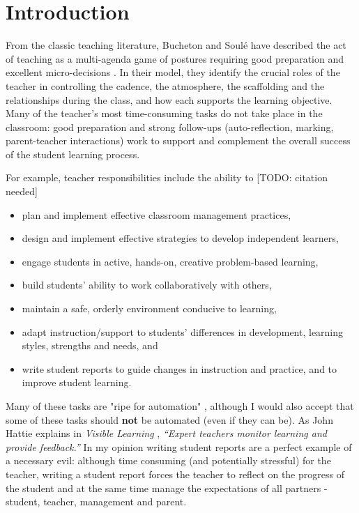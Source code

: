 \documentclass[10pt]{article}
\begin{document}
\tableofcontents



\section{Introduction}

From the classic teaching literature, Bucheton and Soulé have described the act of teaching as a multi-agenda game of postures requiring good preparation and excellent micro-decisions \cite{BS09}. In their model, they identify the crucial roles of the teacher in controlling the cadence, the atmosphere, the scaffolding and the relationships during the class, and how each supports the learning objective. Many of the teacher's most time-consuming tasks do not take place in the classroom: good preparation and strong follow-ups (auto-reflection, marking, parent-teacher interactions) work to support and complement the overall success of the student learning process.

For example, teacher responsibilities include the ability to [TODO: citation needed]
\begin{itemize}
\item plan and implement effective classroom management practices,
\item design and implement effective strategies to develop independent learners,
\item engage students in active, hands-on, creative problem-based learning,
\item build students’ ability to work collaboratively with others,
\item maintain a safe, orderly environment conducive to learning,
\item adapt instruction/support to students’ differences in development, learning styles, strengths and needs, and
\item write student reports to guide changes in instruction and practice, and to improve student learning.
\end{itemize}

Many of these tasks are "ripe for automation" \cite[p.?]{Swei15}, although I would also accept that some of these tasks should \textbf{not} be automated (even if they can be). As John Hattie explains in \emph{Visible Learning} \cite{Hat12}, \emph{``Expert teachers monitor learning and provide feedback.''} In my opinion writing student reports are a perfect example of a necessary evil: although time consuming (and potentially stressful) for the teacher, writing a student report forces the teacher to reflect on the progress of the student and at the same time manage the expectations of all partners - student, teacher, management and parent.
\end{document}
